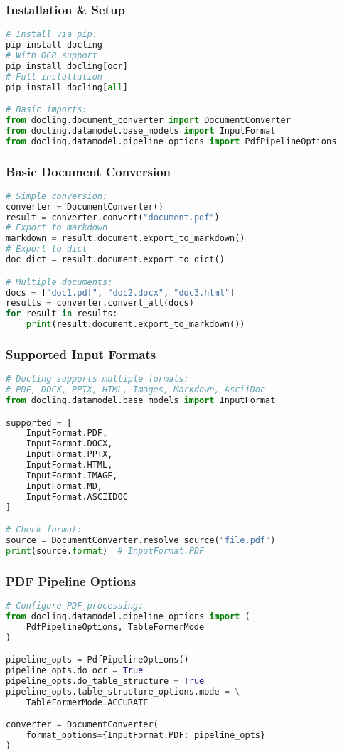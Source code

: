 \begin{frame}[fragile]\frametitle{Installation \& Setup}
\begin{lstlisting}[language=python,basicstyle=\tiny]
# Install via pip:
pip install docling
# With OCR support
pip install docling[ocr]
# Full installation
pip install docling[all]

# Basic imports:
from docling.document_converter import DocumentConverter
from docling.datamodel.base_models import InputFormat
from docling.datamodel.pipeline_options import PdfPipelineOptions
\end{lstlisting}
\end{frame}

\begin{frame}[fragile]\frametitle{Basic Document Conversion}
\begin{lstlisting}[language=python,basicstyle=\tiny]
# Simple conversion:
converter = DocumentConverter()
result = converter.convert("document.pdf")
# Export to markdown
markdown = result.document.export_to_markdown()
# Export to dict
doc_dict = result.document.export_to_dict()

# Multiple documents:
docs = ["doc1.pdf", "doc2.docx", "doc3.html"]
results = converter.convert_all(docs)
for result in results:
    print(result.document.export_to_markdown())
\end{lstlisting}
\end{frame}

\begin{frame}[fragile]\frametitle{Supported Input Formats}
\begin{lstlisting}[language=python,basicstyle=\tiny]
# Docling supports multiple formats:
# PDF, DOCX, PPTX, HTML, Images, Markdown, AsciiDoc
from docling.datamodel.base_models import InputFormat

supported = [
    InputFormat.PDF,
    InputFormat.DOCX,
    InputFormat.PPTX,
    InputFormat.HTML,
    InputFormat.IMAGE,
    InputFormat.MD,
    InputFormat.ASCIIDOC
]

# Check format:
source = DocumentConverter.resolve_source("file.pdf")
print(source.format)  # InputFormat.PDF
\end{lstlisting}
\end{frame}

\begin{frame}[fragile]\frametitle{PDF Pipeline Options}
\begin{lstlisting}[language=python,basicstyle=\tiny]
# Configure PDF processing:
from docling.datamodel.pipeline_options import (
    PdfPipelineOptions, TableFormerMode
)

pipeline_opts = PdfPipelineOptions()
pipeline_opts.do_ocr = True
pipeline_opts.do_table_structure = True
pipeline_opts.table_structure_options.mode = \
    TableFormerMode.ACCURATE

converter = DocumentConverter(
    format_options={InputFormat.PDF: pipeline_opts}
)
\end{lstlisting}
\end{frame}

